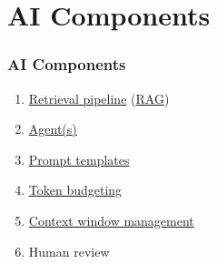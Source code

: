 % 

\section{AI Components}
\begin{frame}\frametitle{AI Components}
\begin{enumerate}
		\item \href{https://www.nimbleway.com/blog/rag-pipeline-guide}{Retrieval pipeline} (\href{https://cratedb.com/use-cases/ai-vector-search/chatbots/rag-pipelines}{RAG})
		\item \href{https://aws.amazon.com/what-is/ai-agents/}{Agent(s)}
		\item \href{https://www.geeksforgeeks.org/artificial-intelligence/prompt-templates/}{Prompt templates}
		\item \href{https://www.vantage.sh/blog/ai-token-budgeting}{Token budgeting}
		\item \href{https://en.wikipedia.org/wiki/Context_window}{Context window management}
		\item Human review
	\end{enumerate}
\end{frame}

\endinput  %

\subsection{A}
\begin{frame}\frametitle{Title}
\center
	Slide content
\end{frame}

\subsection{B}
\begin{frame}\frametitle{Title}
\center
	Slide content
\end{frame}

\endinput  %
